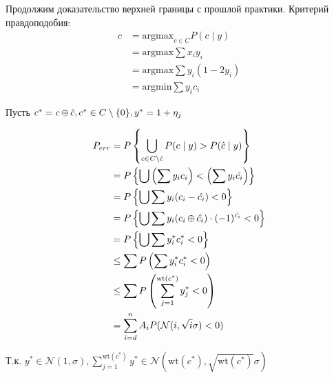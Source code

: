 

\cfoot{}



Продолжим доказательство верхней границы с прошлой практики.
Критерий правдоподобия:
\begin{align}
    c & = \mathrm{argmax}_{c \in C} P(c \mid y) \\
      & = \mathrm{argmax} \sum x_i y_i          \\
      & = \mathrm{argmax} \sum y_i (1 - 2y_i)   \\
      & = \mathrm{argmin} \sum y_i c_i
\end{align}

Пусть \(c^* = c \operatorname*{\oplus} \hat{c}, c^* \in C \setminus \{0\}, y^* = 1 + \eta_j\)

\begin{align}
    P_{err}
     & = P \left\{ \bigcup_{c \in C \setminus \hat{c}} P(c \mid y) > P(\hat{c} \mid y)\right\} \\
     & = P \left\{ \bigcup \left(\sum y_i c_i\right) < \left(\sum y_i \hat{c_i}\right)\right\} \\
     & = P \left\{ \bigcup \sum y_i (c_i - \hat{c_i}) < 0 \right\}                             \\
     & = P \left\{ \bigcup \sum y_i (c_i \operatorname*{\oplus} \hat{c_i}) \cdot ( - 1)^{\hat{c_i}} < 0 \right\} \\
     & = P \left\{ \bigcup \sum y_i^* c_i^* < 0 \right\}                                       \\
     & \leq \sum P \left( \sum y_i^* c_i^* < 0 \right)                                         \\
     & \leq \sum P \left( \sum_{j =1}^{\mathrm{wt}(c^*)} y_j^* < 0 \right)                     \\
     & = \sum_{i= d}^{n} A_i P(\mathcal{N}(i, \sqrt{i} \sigma) < 0)
\end{align}

Т.к. \(y^* \in \mathcal{N}(1, \sigma), \sum_{j=1}^{\mathrm{wt}(c^*)} y^* \in \mathcal{N}(\mathrm{wt}(c^*), \sqrt{\mathrm{wt}(c^*)} \sigma) \)




